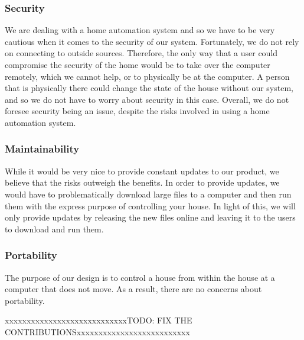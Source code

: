 \documentclass{article}
\begin{document}
\subsubsection{Security}
We are dealing with a home automation system and so we have to be very cautious when it comes to the security of our system. Fortunately, we do not rely on connecting to outside sources. Therefore, the only way that a user could compromise the security of the home would be to take over the computer remotely, which we cannot help, or to physically be at the computer. A person that is physically there could change the state of the house without our system, and so we do not have to worry about security in this case. Overall, we do not foresee security being an issue, despite the risks involved in using a home automation system.

\subsubsection{Maintainability}
While it would be very nice to provide constant updates to our product, we believe that the risks outweigh the benefits. In order to provide updates, we would have to problematically download large files to a computer and then run them with the express purpose of controlling your house. In light of this, we will only provide updates by releasing the new files online and leaving it to the users to download and run them.

\subsubsection{Portability}
The purpose of our design is to control a house from within the house at a computer that does not move. As a result, there are no concerns about portability.



\newpage
{\color{red}xxxxxxxxxxxxxxxxxxxxxxxxxxxxTODO: FIX THE CONTRIBUTIONSxxxxxxxxxxxxxxxxxxxxxxxxxx}
\end{document}
